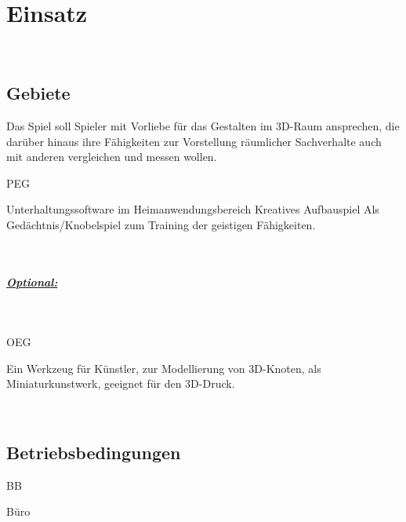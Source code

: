 %
%


\chapter{Einsatz}
\label{ES}~\\


\section{Gebiete}
\label{ES:Gebiete}

Das Spiel soll Spieler mit Vorliebe für das Gestalten im 3D-Raum ansprechen, die darüber hinaus ihre Fähigkeiten zur Vorstellung räumlicher Sachverhalte auch mit anderen vergleichen und messen wollen.\\


\begin{ids}{\gls{PEG}}

	\id[10] Unterhaltungssoftware im Heimanwendungsbereich
	\id[20] Kreatives Aufbauspiel
	\id[30] Als Gedächtnis/Knobelspiel zum Training der geistigen Fähigkeiten.

\end{ids}

~\\


\paragraph*{\underline{Optional:}}~\\

\begin{ids}{\gls{OEG}}

	\id[10] Ein Werkzeug für Künstler, zur Modellierung von 3D-Knoten, als Miniaturkunstwerk, geeignet für den 3D-Druck.

\end{ids}


%
%
~\\

\section{Betriebsbedingungen}
\label{ES:BB}

\begin{ids}{\gls{BB}}

	\id[10] Büro

\end{ids}


